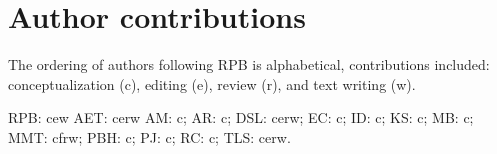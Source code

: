\documentclass[11pt,]{article}
\begin{document}
\hypertarget{author-contributions}{%
\section{Author contributions}\label{author-contributions}}

The ordering of authors following RPB is alphabetical, contributions
included: conceptualization (c), editing (e), review (r), and text
writing (w).

RPB: cew AET: cerw AM: c; AR: c; DSL: cerw; EC: c; ID: c; KS: c; MB: c;
MMT: cfrw; PBH: c; PJ: c; RC: c; TLS: cerw.





\newpage
\singlespacing
\renewcommand\refname{References}

\end{document}
